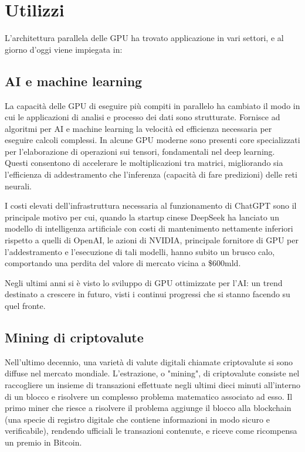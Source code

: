 \documentclass[12pt,a4paper,oneside]{book}
\begin{document}
\section{Utilizzi}
L'architettura parallela delle GPU ha trovato applicazione in vari settori, e al giorno d'oggi viene impiegata in:

\subsection{AI e machine learning}

La capacità delle GPU di eseguire più compiti in parallelo ha cambiato il modo in cui le applicazioni di analisi e processo dei dati sono strutturate. Fornisce ad algoritmi per AI e machine learning la velocità ed efficienza necessaria per eseguire calcoli complessi.
In alcune GPU moderne sono presenti core specializzati per l'elaborazione di operazioni sui tensori, fondamentali nel deep learning. Questi consentono di accelerare le moltiplicazioni tra matrici, migliorando sia l'efficienza di addestramento che l'inferenza (capacità di fare predizioni) delle reti neurali.

I costi elevati dell'infrastruttura necessaria al funzionamento di ChatGPT sono il principale motivo per cui, quando la startup cinese DeepSeek ha lanciato un modello di intelligenza artificiale con costi di mantenimento nettamente inferiori rispetto a quelli di OpenAI, le azioni di NVIDIA, principale fornitore di GPU per l'addestramento e l'esecuzione di tali modelli, hanno subito un brusco calo, comportando una perdita del valore di mercato vicina a \$600mld.

Negli ultimi anni si è visto lo sviluppo di GPU ottimizzate per l'AI: un trend destinato a crescere in futuro, visti i continui progressi che si stanno facendo su quel fronte.

\subsection{Mining di criptovalute}

Nell'ultimo decennio, una varietà di valute digitali chiamate criptovalute si sono diffuse nel mercato mondiale. L'estrazione, o "mining", di criptovalute consiste nel raccogliere un insieme di transazioni effettuate negli ultimi dieci minuti all'interno di un blocco e risolvere un complesso problema matematico associato ad esso. Il primo miner che riesce a risolvere il problema aggiunge il blocco alla blockchain (una specie di registro digitale che contiene informazioni in modo sicuro e verificabile), rendendo ufficiali le transazioni contenute, e riceve come ricompensa un premio in Bitcoin.
\end{document}

